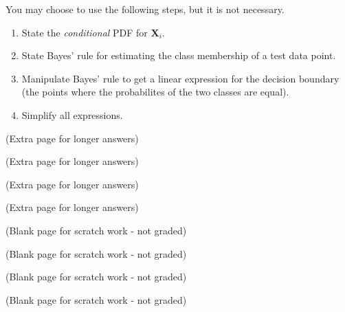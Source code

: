 \documentclass[12pt]{article}
\newcommand{\bX}{\bm{X}}
\begin{document}
\begin{enumerate}[label={\bf MA\arabic*.)}]
You may choose to use the following steps, but it is not necessary. 
\begin{enumerate}
    \item State the \emph{conditional} PDF for $\bX_i$.
    \item State Bayes' rule  for estimating the class membership of a test data point.
    \item Manipulate Bayes' rule to get a linear expression for the decision boundary (the points where the probabilites of the two classes are equal).
    \item Simplify all expressions.
\end{enumerate}
\clearpage 
\end{enumerate}
\clearpage
\begin{center} (Extra page for longer answers) \end{center}

\clearpage
\begin{center} (Extra page for longer answers) \end{center}


\clearpage
\begin{center} (Extra page for longer answers) \end{center}

\clearpage
\begin{center} (Extra page for longer answers) \end{center}

\clearpage
\begin{center} (Blank page for scratch work - not graded) \end{center}

\clearpage
\begin{center} (Blank page for scratch work - not graded) \end{center}

\clearpage
\begin{center} (Blank page for scratch work - not graded) \end{center}


\clearpage
\begin{center} (Blank page for scratch work - not graded) \end{center}


\clearpage 
\end{document}
